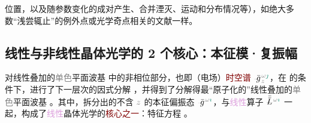 \clearpage

\noindent 位置，以及随参数变化的成对产生、合并湮灭、运动和分布情况等），如绝大多数“浅尝辄止”的\textcolor{PineGreen}{例外点}\cite{hernandezExceptionalPointsNonHermitian2011,hanExceptionalEntanglementPhenomena2023,baiObservationNonlinearExceptional2024,baiNonlinearExceptionalPoints2023}或\textcolor{PineGreen}{光学奇点}\cite{richterExceptionalPointsAnisotropic2017,grundmannSingularOpticalAxes2016,berryOpticalSingularitiesBirefringent2003,berryOpticalSingularitiesBianisotropic2005,grundmannOpticallyAnisotropicMedia2017}相关的文献一样。

\vspace*{-4.5em}

\subsection{线性与非线性晶体光学的 2 个核心：本征模·复振幅}\label{ssec:eigenmodes-compamp}

 对\textcolor{PineGreen}{线性叠加的\textcolor{gray}{单色}平面波基}  中的\textcolor{NavyBlue}{非相位部分}，也即（电场）\textcolor{Maroon}{时空谱} $\xint{{}^{}_{\mathcolor{gray}{-}}}{10}{\bar{g}}^{\;\!\mathcolor{gray}{\omega} \textcolor{PineGreen}{\jmath}}_{\;\! \mathcolor{gray}{z}}$，在  的条件下，进行了下一层次的因式分解 ，并得到了分解得最“原子化的”\textcolor{PineGreen}{线性叠加的\textcolor{gray}{单色}平面波基} 。其中，拆分出的不含 $\mathcolor{gray}{z}$ 的\textcolor{PineGreen}{本征偏振态} $\xint{{}^{}_{\mathcolor{gray}{-}}}{10}{\bar{g}}^{\;\!\mathcolor{gray}{\omega} \textcolor{PineGreen}{\imath}}$，与\textcolor{Plum}{线性}算子 $\xint{\mathcolor{gray}{-}}{30}{\bar{\bar{L}}}^{\;\! \mathcolor{gray}{\omega} \textcolor{PineGreen}{\imath}}$ 一起，构成了\textcolor{Plum}{线性}\textcolor{PineGreen}{晶体光学}的\textcolor{Maroon}{核心之一}：\textcolor{PineGreen}{特征方程} 。

